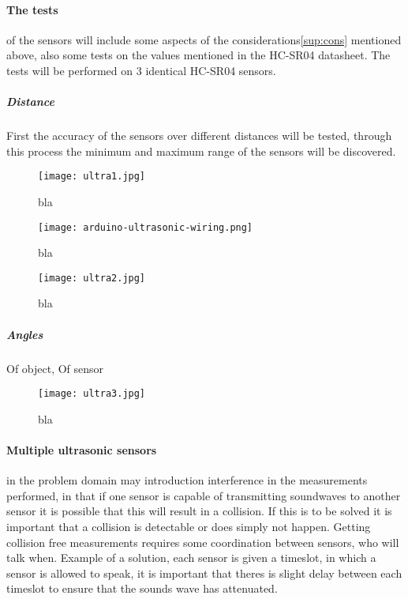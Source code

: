 \paragraph{The tests} of the sensors will include some aspects of the considerations\cref{sup:cons} mentioned above, also some tests on the values mentioned in the HC-SR04 datasheet\cite{hcsr04}. The tests will be performed on 3 identical HC-SR04 sensors.
  
  \subparagraph{Distance}
  First the accuracy of the sensors over different distances will be tested, through this process the minimum and maximum range of the sensors will be discovered. 
  \begin{figure}[htbp]
    \centering
    \texttt{[image: ultra1.jpg]}
    \caption{bla}
    \label{fig:ultra1}
  \end{figure}
  \begin{figure}[htbp]
    \centering
    \texttt{[image: arduino-ultrasonic-wiring.png]}
    \caption{bla}
    \label{fig:ultrasonicwiring}
  \end{figure}
  \begin{figure}[htbp]
    \centering
    \texttt{[image: ultra2.jpg]}
    \caption{bla}
    \label{fig:ultra2}
  \end{figure}
  \subparagraph{Angles}
  Of object, Of sensor
  \begin{figure}[htbp]
    \centering
    \texttt{[image: ultra3.jpg]}
    \caption{bla}
    \label{fig:ultra3}
  \end{figure}
  
\paragraph{Multiple ultrasonic sensors} in the problem domain may introduction interference in the measurements performed, in that if one sensor is capable of transmitting soundwaves to another sensor it is possible that this will result in a collision. If this is to be solved it is important that a collision is detectable or does simply not happen. Getting collision free measurements requires some coordination between sensors, who will talk when. Example of a solution, each sensor is given a timeslot, in which a sensor is allowed to speak, it is important that theres is slight delay between each timeslot to ensure that the sounds wave has attenuated.
